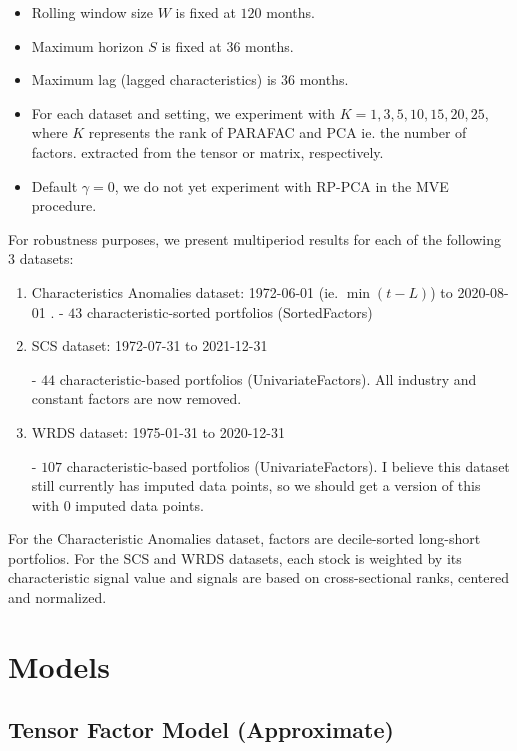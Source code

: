 \documentclass{article}
\begin{document}
\begin{itemize}
    \item Rolling window size $W$ is fixed at $120$ months.
    \item Maximum horizon $S$ is fixed at $36$ months.
    \item Maximum lag (lagged characteristics) is $36$ months.
    \item For each dataset and setting, we experiment with $K = 1, 3, 5, 10, 15, 20, 25$, where 
    $K$ represents the rank of PARAFAC and PCA ie. the number of factors.
extracted from the tensor or matrix, respectively. 
    \item Default $\gamma = 0$, we do not yet experiment with RP-PCA in the MVE procedure.
\end{itemize}

For robustness purposes, we present multiperiod results for each of the following $3$ datasets:

\begin{enumerate}
\item Characteristics Anomalies dataset: 1972-06-01 (ie. $\min(t - L)$)  to 2020-08-01
.
- $43$ characteristic-sorted portfolios (SortedFactors)

\item SCS dataset: 1972-07-31 to 2021-12-31

- $44$ characteristic-based portfolios (UnivariateFactors). All industry and constant factors are now removed.

\item WRDS dataset: 1975-01-31 to 2020-12-31

- $107$ characteristic-based portfolios (UnivariateFactors). I believe this dataset still currently has imputed data points, so we should get a version of this with $0$ imputed data points.


\end{enumerate}

For the Characteristic Anomalies dataset, factors are decile-sorted long-short portfolios. For the SCS and WRDS datasets, 
each stock is weighted by its characteristic signal value
and signals are based on cross-sectional ranks, centered and normalized. 


\section{Models}

\subsection{Tensor Factor Model (Approximate)} \label{approx}
\end{document}
